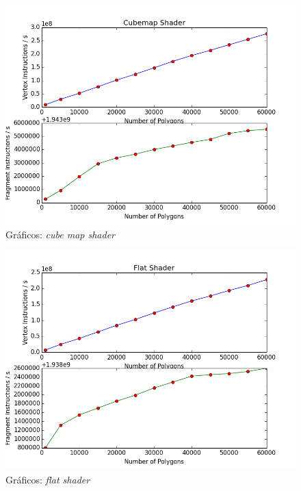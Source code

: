 	\begin{figure}[h]
	\centering
		\includegraphics[keepaspectratio=true,scale=0.6]{figuras/cubeplot.png}
	\caption{Gráficos: \textit{cube map shader}}
	\label{plotcube}
	\end{figure}

	\begin{figure}[h]
	\centering
		\includegraphics[keepaspectratio=true,scale=0.6]{figuras/flatplot.png}
	\caption{Gráficos: \textit{flat shader}}
	\label{plotflat}
	\end{figure}

